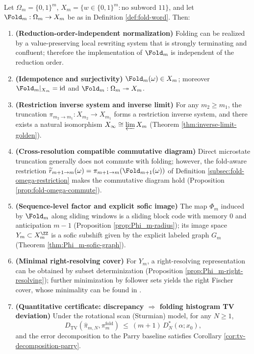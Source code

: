 \begin{theorem}\label{thm:fold-suite}
Let $\Omega_m=\{0,1\}^m$, $X_m=\{w\in\{0,1\}^m:\text{no subword }11\}$, and let $\Fold_m:\Omega_m\to X_m$ be as in Definition \ref{def:fold-word}. Then:
\begin{enumerate}
\normalfont
  \item \textbf{(Reduction-order-independent normalization)} Folding can be realized by a value-preserving local rewriting system that is strongly terminating and confluent; therefore the implementation of $\Fold_m$ is independent of the reduction order.
  \item \textbf{(Idempotence and surjectivity)} \(\Fold_m(\omega)\in X_m\); moreover \(\Fold_m|_{X_m}=\mathrm{id}\) and \(\Fold_m:\Omega_m\twoheadrightarrow X_m\).
  \item \textbf{(Restriction inverse system and inverse limit)} For any $m_2\ge m_1$, the truncation $\pi_{m_2\to m_1}:X_{m_2}\to X_{m_1}$ forms a restriction inverse system, and there exists a natural isomorphism \(X_\infty\cong\varprojlim X_m\) (Theorem \ref{thm:inverse-limit-golden}).
\item \textbf{(Cross-resolution compatible commutative diagram)} Direct microstate truncation generally does not commute with folding; however, the fold-aware restriction \(\widetilde r_{m+1\to m}(\omega)=\pi_{m+1\to m}(\Fold_{m+1}(\omega))\) of Definition \ref{subsec:fold-omega-restriction} makes the commutative diagram hold (Proposition \ref{prop:fold-omega-commute}).
  \item \textbf{(Sequence-level factor and explicit sofic image)} The map \(\Phi_m\) induced by \(\Fold_m\) along sliding windows is a sliding block code with memory $0$ and anticipation $m-1$ (Proposition \ref{prop:Phi_m-radius}); its image space \(Y_m\subset X_m^{\ZZ}\) is a sofic subshift given by the explicit labeled graph \(G_m\) (Theorem \ref{thm:Phi_m-sofic-graph}).
  \item \textbf{(Minimal right-resolving cover)} For \(Y_m\), a right-resolving representation can be obtained by subset determinization (Proposition \ref{prop:Phi_m-right-resolving}); further minimization by follower sets yields the right Fischer cover, whose minimality can be found in \cite{LindMarcus1995,Kitchens1998SymbolicDynamics}.
  \item \textbf{(Quantitative certificate: discrepancy \(\Rightarrow\) folding histogram TV deviation)} Under the rotational scan (Sturmian) model, for any $N\ge 1$,
  \[
  D_{\mathrm{TV}}(\hat{\pi}_{m,N},\pi_m^{\mathrm{fold}})\ \le\ (m+1)\,D_N^*(\alpha;x_0),
  \]
  and the error decomposition to the Parry baseline satisfies Corollary \ref{cor:tv-decomposition-parry}.
\end{enumerate}
\end{theorem}

